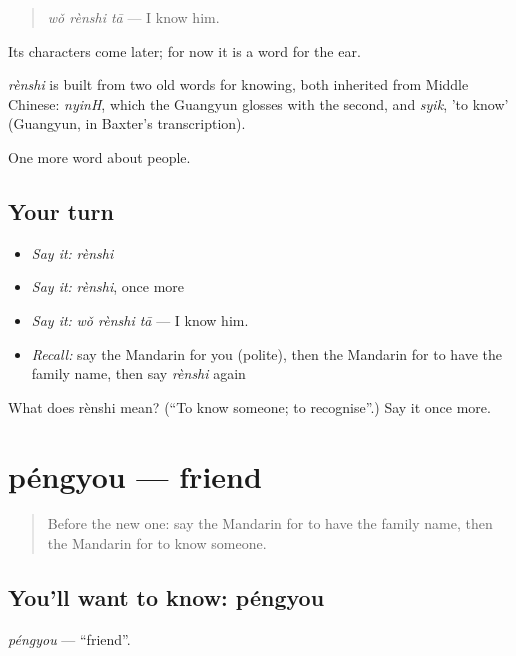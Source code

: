 \begin{quote}
\emph{wǒ rènshi tā} — I know him.
\end{quote}

Its characters come later; for now it is a word for the ear.

\begin{cousinweb}
\emph{rènshi} is built from two old words for knowing, both inherited from Middle Chinese: \emph{nyinH}, which the Guangyun glosses with the second, and \emph{syik}, 'to know' (Guangyun, in Baxter's transcription).
\end{cousinweb}

\begin{grammarlens}[title={What you've built}]
One more word about people.
\end{grammarlens}

\subsection*{Your turn}
\begin{itemize}
\raggedright
  \item \emph{Say it:} \emph{rènshi}
  \item \emph{Say it:} \emph{rènshi}, once more
  \item \emph{Say it:} \emph{wǒ rènshi tā} — I know him.
  \item \emph{Recall:} say the Mandarin for you (polite), then the Mandarin for to have the family name, then say \emph{rènshi} again
\end{itemize}

\begin{tcolorbox}[breakable,colback=teal!4,colframe=teal!35!black,title={Before you move on}]
What does rènshi mean? (\textquotedblleft{}To know someone; to recognise\textquotedblright{}.) Say it once more.
\end{tcolorbox}
\section[péngyou]{péngyou — friend}

\label{lesson:ZH-C34-pengyou}



\begin{quote}
Before the new one: say the Mandarin for to have the family name, then the Mandarin for to know someone.
\end{quote}

\subsection*{You'll want to know: péngyou}
\emph{péngyou} — \textquotedblleft{}friend\textquotedblright{}.


